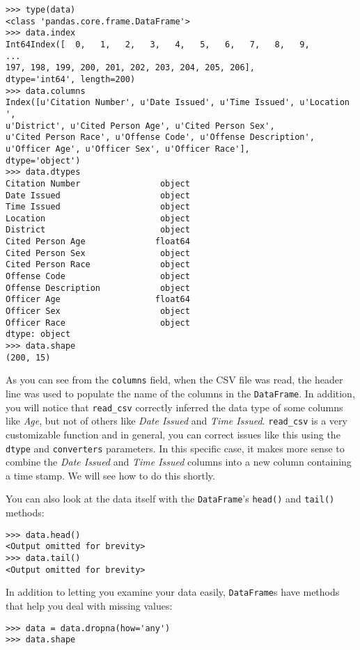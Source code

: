 \begin{lstlisting}
>>> type(data)
<class 'pandas.core.frame.DataFrame'>
>>> data.index
Int64Index([  0,   1,   2,   3,   4,   5,   6,   7,   8,   9,
...
197, 198, 199, 200, 201, 202, 203, 204, 205, 206],
dtype='int64', length=200)
>>> data.columns
Index([u'Citation Number', u'Date Issued', u'Time Issued', u'Location ',
u'District', u'Cited Person Age', u'Cited Person Sex',
u'Cited Person Race', u'Offense Code', u'Offense Description',
u'Officer Age', u'Officer Sex', u'Officer Race'],
dtype='object')
>>> data.dtypes
Citation Number                object
Date Issued                    object
Time Issued                    object
Location                       object
District                       object
Cited Person Age              float64
Cited Person Sex               object
Cited Person Race              object
Offense Code                   object
Offense Description            object
Officer Age                   float64
Officer Sex                    object
Officer Race                   object
dtype: object
>>> data.shape
(200, 15)
\end{lstlisting}

As you can see from the \texttt{columns} field, when the CSV file was
read, the header line was used to populate the name of the columns in
the \texttt{DataFrame}. In addition, you will notice that
\verb|read_csv| correctly inferred the data type of some columns like
\emph{Age}, but not of others like \emph{Date Issued} and \emph{Time
Issued}. \verb|read_csv| is a very customizable function and in
general, you can correct issues like this using the \texttt{dtype} and
\texttt{converters} parameters. In this specific case, it makes more
sense to combine the \emph{Date Issued} and \emph{Time Issued} columns
into a new column containing a time stamp. We will see how to do this
shortly.

You can also look at the data itself with the \texttt{DataFrame}'s
\texttt{head()} and \texttt{tail()} methods:

\begin{lstlisting}
>>> data.head()
<Output omitted for brevity>
>>> data.tail()
<Output omitted for brevity>
\end{lstlisting}

In addition to letting you examine your data easily, \texttt{DataFrame}s
have methods that help you deal with missing values:

\begin{lstlisting}
>>> data = data.dropna(how='any')
>>> data.shape
\end{lstlisting}

